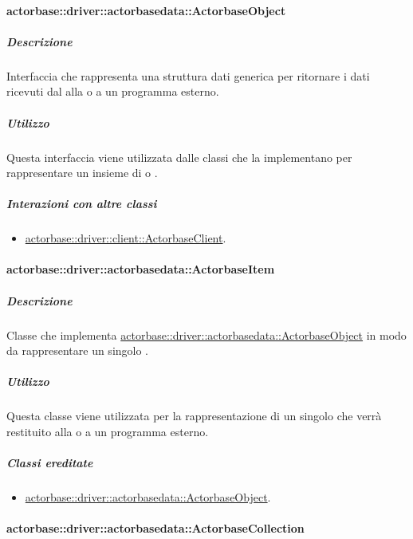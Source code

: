 \documentclass{scalatekids-article}
\begin{document}
\paragraph{actorbase::driver::actorbasedata::ActorbaseObject}
\label{sec:actorbase::driver::actorbasedata::ActorbaseObject}

\subparagraph{Descrizione}

Interfaccia che rappresenta una struttura dati generica per ritornare i dati
ricevuti dal  alla  o a un programma esterno.

\subparagraph{Utilizzo}

Questa interfaccia viene utilizzata dalle classi che la implementano per
rappresentare un insieme di  o .

\subparagraph{Interazioni con altre classi}

\begin{itemize}
\item \hyperref[sec:actorbase::driver::client::ActorbaseClient]{actorbase::driver::client::ActorbaseClient}.
\end{itemize}

\paragraph{actorbase::driver::actorbasedata::ActorbaseItem}
\label{sec:actorbase::driver::actorbasedata::ActorbaseItem}

\subparagraph{Descrizione}

Classe che implementa \hyperref[sec:actorbase::driver::actorbasedata::ActorbaseObject]{actorbase::driver::actorbasedata::ActorbaseObject}
in modo da rappresentare un singolo .

\subparagraph{Utilizzo}

Questa classe viene utilizzata per la rappresentazione di un singolo
 che verrà restituito alla  o a un programma esterno.

\subparagraph{Classi ereditate}

\begin{itemize}
\item \hyperref[sec:actorbase::driver::actorbasedata::ActorbaseObject]{actorbase::driver::actorbasedata::ActorbaseObject}.
\end{itemize}

\paragraph{actorbase::driver::actorbasedata::ActorbaseCollection}
\label{sec:actorbase::driver::actorbasedata::ActorbaseCollection}
\end{document}
